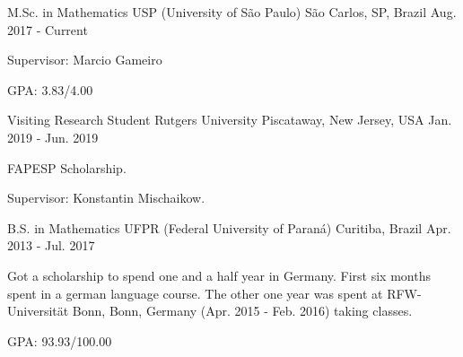 

\begin{cventries}

  \cventry
    {M.Sc. in Mathematics} %
    {USP (University of São Paulo)} %
    {São Carlos, SP, Brazil} %
    {Aug. 2017 - Current}
    {
      \begin{cvitems} %
        \item{Supervisor: Marcio Gameiro}
        \item{GPA: 3.83/4.00}
      \end{cvitems}
    }

  \cventry
    {Visiting Research Student}
    {Rutgers University}
    {Piscataway, New Jersey, USA}
    {Jan. 2019 - Jun. 2019}
    {
      \begin{cvitems}
        \item{FAPESP Scholarship.}
        \item{Supervisor: Konstantin Mischaikow.}
      \end{cvitems}
    }

  \cventry
    {B.S. in Mathematics} %
    {UFPR (Federal University of Paraná)} %
    {Curitiba, Brazil} %
    {Apr. 2013 - Jul. 2017} %
    {
      \begin{cvitems} %
        \item{Got a scholarship to spend one and a half year in Germany.
              First six months spent in a german language course.
              The other one year was spent at RFW-Universität Bonn, Bonn, Germany
              (Apr. 2015 - Feb. 2016) taking classes.}
        \item{GPA: 93.93/100.00}
      \end{cvitems}
    }

\end{cventries}
